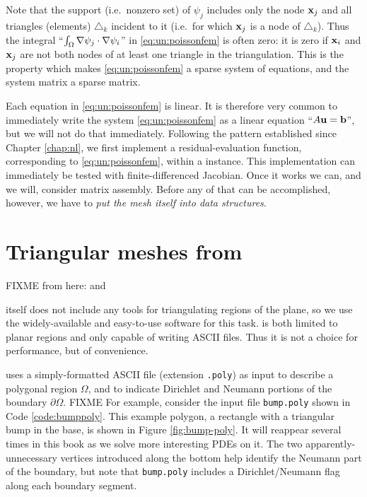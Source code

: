 Note that the support (i.e.~nonzero set) of $\psi_j$ includes only the node $\mathbf{x}_j$ and all triangles (elements) $\triangle_k$ incident to it (i.e.~for which $\mathbf{x}_j$ is a node of $\triangle_k$).  Thus the integral ``$\int_\Omega \nabla \psi_j \cdot \nabla \psi_i$'' in \eqref{eq:un:poissonfem} is often zero: it is zero if $\mathbf{x}_i$ and $\mathbf{x}_j$ are not both nodes of at least one triangle in the triangulation.  This is the property which makes \eqref{eq:un:poissonfem} a sparse system of equations, and the system matrix a sparse matrix.

Each equation in \eqref{eq:un:poissonfem} is linear.  It is therefore very common to immediately write the system \eqref{eq:un:poissonfem} as a linear equation ``$A \mathbf{u} = \mathbf{b}$'', but we will not do that immediately.  Following the pattern established since Chapter \ref{chap:nl}, we first implement a residual-evaluation function, corresponding to \eqref{eq:un:poissonfem}, within a \PETSc \pSNES instance.  This implementation can immediately be tested with finite-differenced Jacobian.  Once it works we can, and we will, consider matrix assembly.  Before any of that can be accomplished, however, we have to \emph{put the mesh itself into \PETSc data structures}.


\section{Triangular meshes from \Triangle}

FIXME from here: \pIS and \pSNES

\PETSc itself does not include any tools for triangulating regions of the plane, so we use the widely-available and easy-to-use \Triangle{} software \citep{Shewchuk1996} for this task.  \Triangle is both limited to planar regions and only capable of writing ASCII files.  Thus it is not a choice for performance, but of convenience.

\Triangle uses a simply-formatted ASCII file (extension \texttt{.poly}) as input to describe a polygonal region $\Omega$, and to indicate Dirichlet and Neumann portions of the boundary $\partial \Omega$.  FIXME For example, consider the input file \texttt{bump.poly} shown in Code \ref{code:bumppoly}.  This example polygon, a rectangle with a triangular bump in the base, is shown in Figure \ref{fig:bump-poly}.  It will reappear several times in this book as we solve more interesting PDEs on it.  The two apparently-unnecessary vertices introduced along the bottom help identify the Neumann part of the boundary, but note that \texttt{bump.poly} includes a Dirichlet/Neumann flag along each boundary segment.

